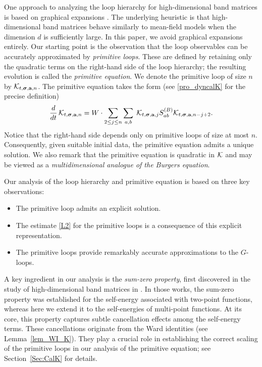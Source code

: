 \documentclass[10pt,reqno]{article}
\theoremstyle{plain} %
\theoremstyle{remark}
\numberwithin{equation}{section}
\begin{document}
One approach to analyzing the loop hierarchy for high-dimensional band matrices is based on graphical expansions \cite{yang2021delocalization, Xu:2024aa}. The underlying heuristic is that high-dimensional band matrices behave similarly to mean-field models when the dimension \(d\) is sufficiently large. In this paper, we avoid graphical expansions entirely. Our starting point is the observation that the loop observables can be accurately approximated by \emph{primitive loops}. These are defined by retaining only the quadratic terms on the right-hand side of the loop hierarchy; the resulting evolution is called the \emph{primitive equation}. We denote the primitive loop of size \(n\) by
\({\cal K}_{t, \boldsymbol{\sigma}, \textbf{a}, n}\). The primitive equation takes the form (see \eqref{pro_dyncalK} for the precise definition)
\begin{align}\label{PE}
       \frac{d}{dt}\,{\cal K}_{t, \boldsymbol{\sigma}, \textbf{a}, n}
       =
       {W}\cdot  \sum_{2 \le   j  \le   n} \sum_{a, b} \; {\cal K}_{t, \boldsymbol{\sigma}, \textbf{a}, j}  S^{(B)}_{ab}  {\cal K}_{t, \boldsymbol{\sigma}, \textbf{a}, n-j+2}.
\end{align}
Notice that the right-hand side depends only on primitive loops of size at most \(n\). Consequently, given suitable initial data, the primitive equation admits a unique solution. We also remark that the primitive equation is quadratic in \(\cal K\) and may be viewed as a \emph{multidimensional analogue of the Burgers equation}.

Our analysis of the loop hierarchy and primitive equation is based on three key observations:
\begin{itemize}
    \item The primitive loop admits an explicit solution.

    \item  The estimate \eqref{L2} for the primitive loops  is a consequence of this explicit representation.

    \item The primitive loops provide remarkably accurate approximations to the \(G\)-loops.
\end{itemize}

 
A key ingredient in our analysis is the \emph{sum-zero property}, first discovered in the study of high-dimensional band matrices in
\cite{yang2021delocalization, Xu:2024aa}. In those works, the sum-zero property was established for the self-energy associated with two-point functions, whereas here we extend it to the self-energies of multi-point functions. At its core, this property captures subtle cancellation effects among the self-energy terms. These cancellations originate from the Ward identities (see Lemma~\ref{lem_WI_K}). They play a crucial role in establishing the correct scaling of the primitive loops in our analysis of the primitive equation; see Section~\ref{Sec:CalK} for details.
 
\end{document}
